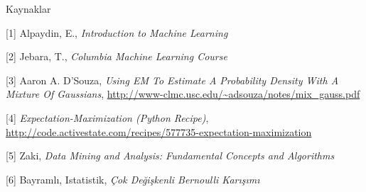 \documentclass[12pt,fleqn]{article}\usepackage{../../common}
\begin{document}
Kaynaklar

[1] Alpaydin, E., {\em Introduction to Machine Learning}

[2] Jebara, T., {\em Columbia Machine Learning Course}

[3] Aaron A. D'Souza, {\em Using EM To Estimate A Probability Density With A
Mixture Of Gaussians}, \url{http://www-clmc.usc.edu/~adsouza/notes/mix_gauss.pdf}

[4] {\em Expectation-Maximization (Python Recipe)}, \url{http://code.activestate.com/recipes/577735-expectation-maximization}

[5] Zaki, {\em Data Mining and Analysis: Fundamental Concepts and Algorithms}

[6] Bayramlı, Istatistik, {\em Çok Değişkenli Bernoulli Karışımı}
\end{document}
